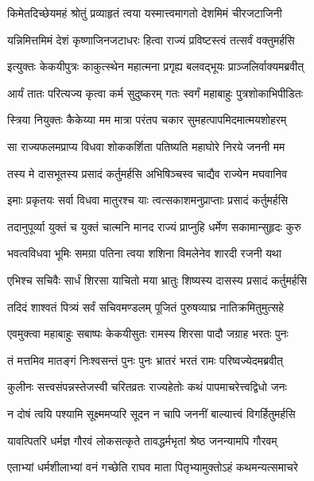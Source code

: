 \twolineshloka
{किमेतदिच्छेयमहं श्रोतुं प्रव्याहृतं त्वया}
{यस्मात्त्वमागतो देशमिमं चीरजटाजिनी} %

\twolineshloka
{यन्निमित्तमिमं देशं कृष्णाजिनजटाधरः}
{हित्वा राज्यं प्रविष्टस्त्वं तत्सर्वं वक्तुमर्हसि} %

\twolineshloka
{इत्युक्तः केकयीपुत्रः काकुत्स्थेन महात्मना}
{प्रगृह्य बलवद्भूयः प्राञ्जलिर्वाक्यमब्रवीत्} %

\twolineshloka
{आर्यं तातः परित्यज्य कृत्वा कर्म सुदुष्करम्}
{गतः स्वर्गं महाबाहुः पुत्रशोकाभिपीडितः} %

\twolineshloka
{स्त्रिया नियुक्तः कैकेय्या मम मात्रा परंतप}
{चकार सुमहत्पापमिदमात्मयशोहरम्} %

\twolineshloka
{सा राज्यफलमप्राप्य विधवा शोककर्शिता}
{पतिष्यति महाघोरे निरये जननी मम} %

\twolineshloka
{तस्य मे दासभूतस्य प्रसादं कर्तुमर्हसि}
{अभिषिञ्चस्व चाद्यैव राज्येन मघवानिव} %

\twolineshloka
{इमाः प्रकृतयः सर्वा विधवा मातुरश्च याः}
{त्वत्सकाशमनुप्राप्ताः प्रसादं कर्तुमर्हसि} %

\twolineshloka
{तदानुपूर्व्या युक्तं च युक्तं चात्मनि मानद}
{राज्यं प्राप्नुहि धर्मेण सकामान्सुहृदः कुरु} %

\twolineshloka
{भवत्वविधवा भूमिः समग्रा पतिना त्वया}
{शशिना विमलेनेव शारदी रजनी यथा} %

\twolineshloka
{एभिश्च सचिवैः सार्धं शिरसा याचितो मया}
{भ्रातुः शिष्यस्य दासस्य प्रसादं कर्तुमर्हसि} %

\twolineshloka
{तदिदं शाश्वतं पित्र्यं सर्वं सचिवमण्डलम्}
{पूजितं पुरुषव्याघ्र नातिक्रमितुमुत्सहे} %

\twolineshloka
{एवमुक्त्वा महाबाहुः सबाष्पः केकयीसुतः}
{रामस्य शिरसा पादौ जग्राह भरतः पुनः} %

\twolineshloka
{तं मत्तमिव मातङ्गं निःश्वसन्तं पुनः पुनः}
{भ्रातरं भरतं रामः परिष्वज्येदमब्रवीत्} %

\twolineshloka
{कुलीनः सत्त्वसंपन्नस्तेजस्वी चरितव्रतः}
{राज्यहेतोः कथं पापमाचरेत्त्वद्विधो जनः} %

\twolineshloka
{न दोषं त्वयि पश्यामि सूक्ष्ममप्यरि सूदन}
{न चापि जननीं बाल्यात्त्वं विगर्हितुमर्हसि} %

\twolineshloka
{यावत्पितरि धर्मज्ञ गौरवं लोकसत्कृते}
{तावद्धर्मभृतां श्रेष्ठ जनन्यामपि गौरवम्} %

\twolineshloka
{एताभ्यां धर्मशीलाभ्यां वनं गच्छेति राघव}
{माता पितृभ्यामुक्तोऽहं कथमन्यत्समाचरे} %

